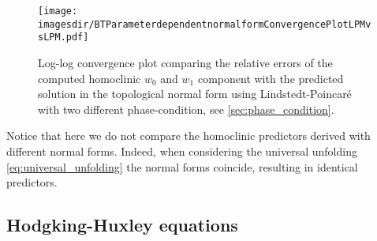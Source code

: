 \begin{figure}
    \texttt{[image: \\imagesdir/BTParameterdependentnormalformConvergencePlotLPMvsLPM.pdf]}
    \label{fig:LPM_vs_LPM}
    \caption{
        Log-log convergence plot comparing the relative errors of the computed
        homoclinic $w_0$ and $w_1$ component with the predicted solution in the
        topological normal form using Lindstedt-Poincar\'e with two different
        phase-condition, see \cref{sec:phase_condition}.}
\end{figure}
Notice that here we do not compare the homoclinic predictors derived with
different normal forms. Indeed, when considering the universal unfolding
\cref{eq:universal_unfolding} the normal forms coincide, resulting in identical
predictors.


\subsection{Hodgking-Huxley equations}

